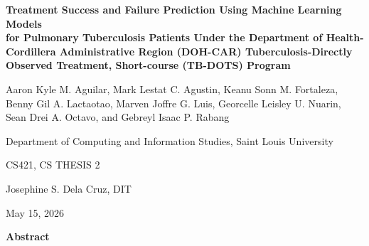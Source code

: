 \documentclass[12pt]{article}
\renewcommand{\_}{\textunderscore\allowbreak}
\begin{document}
\begin{center}
\vspace*{3\baselineskip}

{\bfseries Treatment Success and Failure Prediction Using Machine Learning Models\\
for Pulmonary Tuberculosis Patients Under the Department of Health-Cordillera Administrative Region (DOH-CAR) Tuberculosis-Directly Observed Treatment, Short-course (TB-DOTS) Program}

\vspace{2\baselineskip}

Aaron Kyle M. Aguilar, Mark Lestat C. Agustin, Keanu Sonn M. Fortaleza,\\
Benny Gil A. Lactaotao, Marven Joffre G. Luis, Georcelle Leisley U. Nuarin,\\
Sean Drei A. Octavo, and Gebreyl Isaac P. Rabang

\vspace{0.5\baselineskip}

Department of Computing and Information Studies, Saint Louis University

\vspace{0.5\baselineskip}
CS421, CS THESIS 2

\vspace{0.5\baselineskip}
Josephine S. Dela Cruz, DIT

\vspace{0.5\baselineskip}
May 15, 2026

\end{center}

\newpage

\begingroup
\setcounter{tocdepth}{2}
\renewcommand{\contentsname}{Table of Contents}
\singlespacing
\tableofcontents
\endgroup

\newpage

\begin{center}
\textbf{Abstract}
\end{center}
\end{document}
